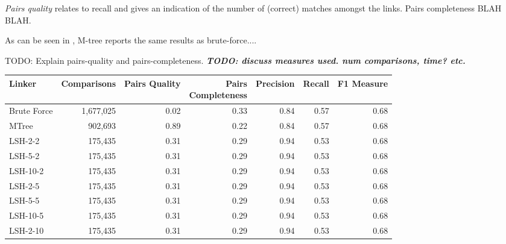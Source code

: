 \documentclass{llncs}
\begin{document}
\textit{Pairs quality}  relates to recall and gives an indication of the number of (correct) matches amongst the links. 
Pairs completeness BLAH BLAH.

As can be seen in , M-tree reports the same results as brute-force....




TODO: Explain pairs-quality and pairs-completeness.
\emph{\textbf{TODO: discuss measures used. num comparisons, time? etc.}}


\begin{table}[ht]
\centering
\begin{tabular}{l|r|r|r|r|r|r}
\parbox{0.18\linewidth}{\centering Linker} &
\parbox{0.16\linewidth}{\centering Comparisons} &
\parbox{0.11\linewidth}{\centering Pairs Quality} &
\parbox{0.17\linewidth}{\centering Pairs \\ Completeness} &
\parbox{0.11\linewidth}{\centering Precision} &
\parbox{0.08\linewidth}{\centering Recall} &
\parbox{0.11\linewidth}{\centering F1 Measure} \\ \hline \hline
Brute Force        & 1,677,025                    & 0.02                  & 0.33                       & 0.84      & 0.57   & 0.68       \\ \hline
MTree              &  902,693                     & 0.89                  & 0.22                       & 0.84      & 0.57   & 0.68       \\ \hline
LSH-2-2            &  175,435                     & 0.31                  & 0.29                       & 0.94      & 0.53   & 0.68       \\
LSH-5-2            &  175,435                     & 0.31                  & 0.29                       & 0.94      & 0.53   & 0.68       \\
LSH-10-2           &  175,435                     & 0.31                  & 0.29                       & 0.94      & 0.53   & 0.68       \\
LSH-2-5            &  175,435                     & 0.31                  & 0.29                       & 0.94      & 0.53   & 0.68       \\
LSH-5-5            &  175,435                     & 0.31                  & 0.29                       & 0.94      & 0.53   & 0.68       \\
LSH-10-5           &  175,435                     & 0.31                  & 0.29                       & 0.94      & 0.53   & 0.68       \\
LSH-2-10           &  175,435                     & 0.31                  & 0.29                       & 0.94      & 0.53   & 0.68       \\

\end{tabular}
\end{table}
\end{document}
